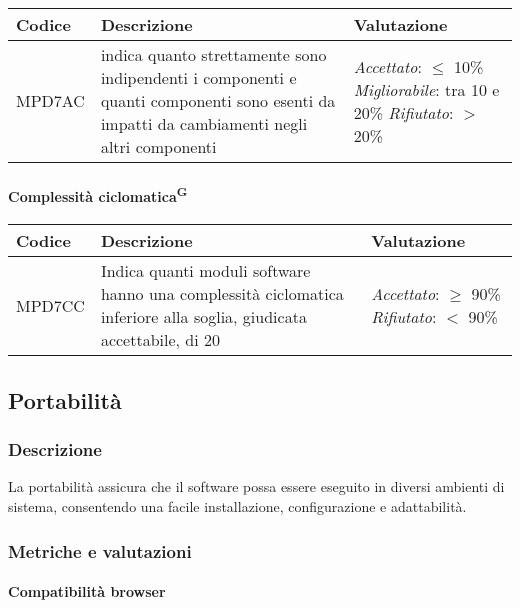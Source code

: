 \begin{table}[h]
\centering
\begin{tabular}{ |>{\centering\arraybackslash}m{3cm}|>{\centering\arraybackslash}m{8cm}|>{\centering\arraybackslash}m{5cm}| }
\hline
Codice & Descrizione & Valutazione\\
\hline
MPD7AC & indica quanto strettamente sono indipendenti i componenti e quanti componenti sono esenti da impatti da cambiamenti negli altri componenti&
\textit{Accettato}:  $\leq$ 10\%
\textit{Migliorabile}: tra 10 e 20\%
\textit{Rifiutato}:  $>$ 20\% \\
\hline
\end{tabular}
\end{table}

\paragraph{Complessità ciclomatica\textsuperscript{G}}

\begin{table}[h]
\centering
\begin{tabular}{ |>{\centering\arraybackslash}m{3cm}|>{\centering\arraybackslash}m{10cm}|>{\centering\arraybackslash}m{3cm}| }
\hline
Codice & Descrizione & Valutazione\\
\hline
MPD7CC & Indica quanti moduli software hanno una complessità ciclomatica inferiore alla soglia, giudicata accettabile, di 20&
\textit{Accettato}:  $\geq$ 90\%
\textit{Rifiutato}:  $<$ 90\% \\
\hline
\end{tabular}
\end{table}

\subsection{Portabilità}
\subsubsection{Descrizione}
La portabilità assicura che il software possa essere eseguito in diversi ambienti di sistema, consentendo una facile installazione, configurazione e adattabilità.
\subsubsection{Metriche e valutazioni}
\paragraph{Compatibilità browser}


